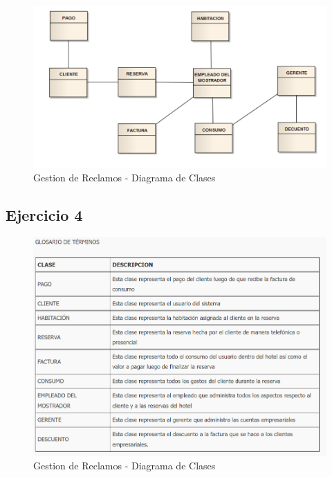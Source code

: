\documentclass[12pt,letterpaper]{article}
\begin{document}
	\begin{figure}[H]
		\centering
		\includegraphics[scale=0.2]{img/ej3.PNG}    
		\caption{Gestion de Reclamos - Diagrama de Clases }
	\label{fig:rc}
	\end{figure}
	\vspace{1cm}
	
\subsection{\textbf{Ejercicio 4}}
 	\begin{figure}[H]
		\centering
		\includegraphics[scale=0.4]{img/ej4.PNG}    
		\caption{Gestion de Reclamos - Diagrama de Clases }
	\label{fig:rc}
	\end{figure}
	\vspace{1cm}
\end{document}
